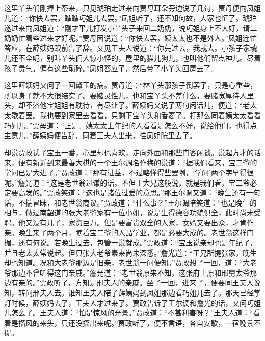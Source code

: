 \begin{parag}
    这里丫头们刚捧上茶来，只见琥珀走过来向贾母耳朵旁边说了几句，贾母便向凤姐儿道：“你快去罢，瞧瞧巧姐儿去罢。”凤姐听了，还不知何故，大家也怔了。琥珀遂过来向凤姐道：“刚才平儿打发小丫头子来回二奶奶，说巧姐身上不大好，请二奶奶忙着些过来才好呢。”贾母因说道：“你快去罢，姨太太也不是外人。”凤姐连忙答应，在薛姨妈跟前告了辞。又见王夫人说道：“你先过去，我就去。小孩子家魂儿还不全呢，别叫丫头们大惊小怪的，屋里的猫儿狗儿，也叫他们留点神儿。尽着孩子贵气，偏有这些琐碎。”凤姐答应了，然后带了小丫头回房去了。
\end{parag}


\begin{parag}
    这里薛姨妈又问了一回黛玉的病。贾母道：“林丫头那孩子倒罢了，只是心重些，所以身子就不大很结实了。要赌灵性儿，也和宝丫头不差什么，要赌宽厚待人里头，却不济他宝姐姐有耽待，有尽让了。”薛姨妈又说了两句闲话儿，便道：“老太太歇着罢。我也要到家里去看看，只剩下宝丫头和香菱了。打那么同着姨太太看看巧姐儿。”贾母道：“正是。姨太太上年纪的人看看是怎么不好，说给他们，也得点主意儿。”薛姨妈便告辞，同着王夫人出来，往凤姐院里去了。
\end{parag}


\begin{parag}
    却说贾政试了宝玉一番，心里却也喜欢，走向外面和那些门客闲谈。说起方才的话来，便有新近到来最善大棋的一个王尔调名作梅的说道：“据我们看来，宝二爷的学问已是大进了。”贾政道：“那有进益，不过略懂得些罢咧，‘学问’两个字早得很呢。”詹光道：“这是老世翁过谦的话。不但王大兄这般说，就是我们看，宝二爷必定要高发的。”贾政笑道：“这也是诸位过爱的意思。”那王尔调又道：“晚生还有一句话，不揣冒昧，和老世翁商议。”贾政道：“什么事？”王尔调陪笑道：“也是晚生的相与，做过南韶道的张大老爷家有一位小姐，说是生得德容功貌俱全，此时尚未受聘。他又没有儿子，家资巨万。但是要富贵双全的人家，女婿又要出众，才肯作亲。晚生来了两个月，瞧着宝二爷的人品学业，都是必要大成的。老世翁这样门楣，还有何说。若晚生过去，包管一说就成。”贾政道：“宝玉说亲却也是年纪了，并且老太太常说起。但只张大老爷素来尚未深悉。”詹光道：“王兄所提张家，晚生却也知道。况和大老爷那边是旧亲，老世翁一问便知。”贾政想了一回，道：“大老爷那边不曾听得这门亲戚。”詹光道：“老世翁原来不知，这张府上原和邢舅太爷那边有亲的。”贾政听了，方知是邢夫人的亲戚。坐了一回，进来了，便要同王夫人说知，转问邢夫人去。谁知王夫人陪了薛姨妈到凤姐那边看巧姐儿去了。那天已经掌灯时候，薛姨妈去了，王夫人才过来了。贾政告诉了王尔调和詹光的话，又问巧姐儿怎么了。王夫人道：“怕是惊风的光景。”贾政道：“不甚利害呀？”王夫人道：“看着是搐风的来头，只还没搐出来呢。”贾政听了，便不言语，各自安歇，一宿晚景不提。
\end{parag}


